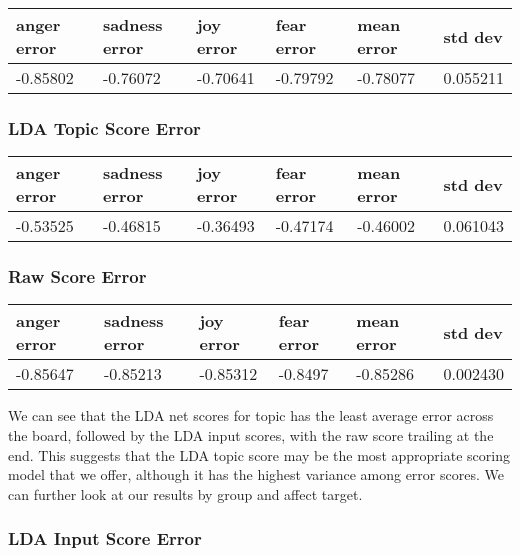 \documentclass[11pt, twoside, reqno]{book}
\begin{document}
\begin{tabular}{|l|l|l|l|l|l|}
\hline
    anger error & sadness error & joy error & fear error & mean error & std dev \\ \hline
    -0.85802 & -0.76072 & -0.70641 & -0.79792 & -0.78077 & 0.055211 \\ \hline
\end{tabular}
\vspace{16pt}

\subsubsection{\textbf{LDA Topic Score Error}}

\begin{tabular}{|l|l|l|l|l|l|}
\hline
    anger error & sadness error & joy error & fear error & mean error & std dev \\ \hline
    -0.53525 & -0.46815 & -0.36493 & -0.47174 & -0.46002 & 0.061043 \\ \hline
\end{tabular}
\vspace{16pt}

\subsubsection{\textbf{Raw Score Error}}
\begin{tabular}{|l|l|l|l|l|l|}
\hline
    anger error & sadness error & joy error & fear error & mean error & std dev \\ \hline
    -0.85647 & -0.85213 & -0.85312 & -0.8497 & -0.85286 & 0.002430 \\ \hline
\end{tabular}
\vspace{16pt}

We can see that the LDA net scores for topic has the least average error across the board, followed by the LDA input scores, with the raw score trailing at the end. This suggests that the LDA topic score may be the most appropriate scoring model that we offer, although it has the highest variance among error scores. We can further look at our results by group and affect target.

\subsubsection{\textbf{LDA Input Score Error}}
\end{document}

